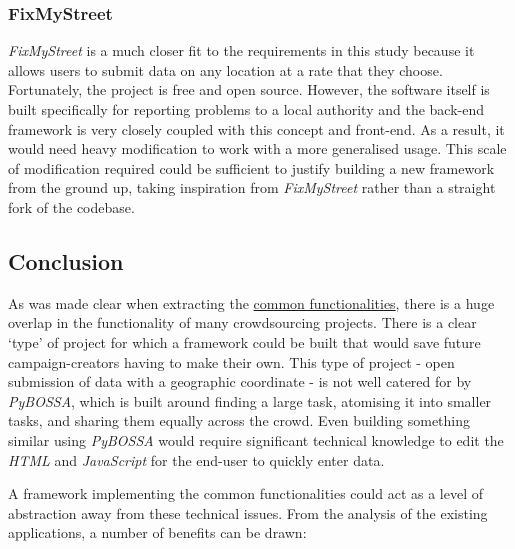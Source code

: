 \documentclass{article}
\begin{document}
		\subsubsection{FixMyStreet}

		\emph{FixMyStreet} is a much closer fit to the requirements in this study because it allows users to submit data on any location at a rate that they choose. Fortunately, the project is free\cite{_mysociety/fixmystreet_2015} and open source. However, the software itself is built specifically for reporting problems to a local authority and the back-end framework is very closely coupled with this concept and front-end. As a result, it would need heavy modification to work with a more generalised usage. This scale of modification required could be sufficient to justify building a new framework from the ground up, taking inspiration from \emph{FixMyStreet} rather than a straight fork of the codebase.

		\subsection{Conclusion}

		As was made clear when extracting the \hyperref[sec:common-functionalities]{common functionalities}, there is a huge overlap in the functionality of many crowdsourcing projects. There is a clear `type' of project for which a framework could be built that would save future campaign-creators having to make their own. This type of project - open submission of data with a geographic coordinate - is not well catered for by \emph{PyBOSSA}, which is built around finding a large task, atomising it into smaller tasks, and sharing them equally across the crowd. Even building something similar using \emph{PyBOSSA} would require significant technical knowledge to edit the \emph{HTML} and \emph{JavaScript} for the end-user to quickly enter data.

		A framework implementing the common functionalities could act as a level of abstraction away from these technical issues. From the analysis of the existing applications, a number of benefits can be drawn:
\end{document}

